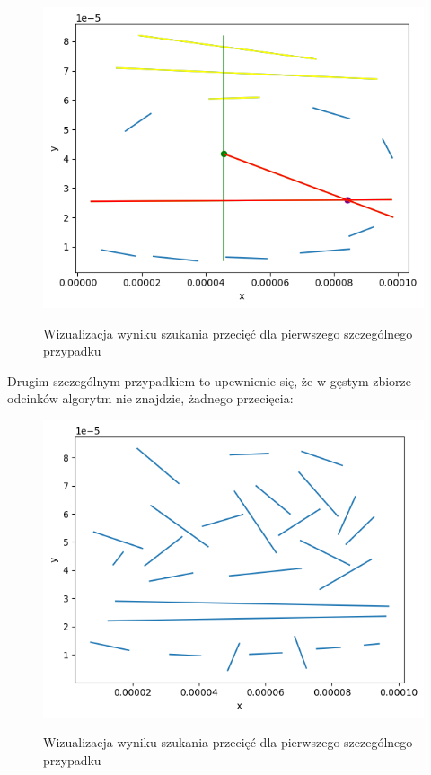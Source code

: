 \documentclass[a4paper]{article}
\begin{document}
\begin{figure}[H]
    \centering
    \includegraphics[width=\textwidth]{wizualizacje/is_random_edge_case_1.png}
    \label{fig:is_intersect_random_edgecase_1}
    \caption{Wizualizacja wyniku szukania przecięć dla pierwszego szczególnego przypadku}
\end{figure}

Drugim szczególnym przypadkiem to upewnienie się, że w gęstym zbiorze odcinków algorytm nie znajdzie,
żadnego przecięcia:
\begin{figure}[H]
    \centering
    \includegraphics[width=\textwidth]{wizualizacje/is_random_edge_case_2.png}
    \label{fig:is_intersect_random_edgecase_2}
    \caption{Wizualizacja wyniku szukania przecięć dla pierwszego szczególnego przypadku}
\end{figure}
\end{document}
